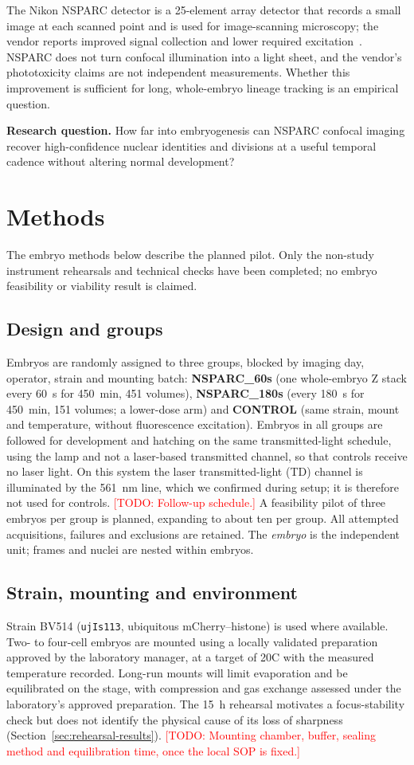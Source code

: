 \documentclass[11pt]{article}
\newcommand{\todo}[1]{\textcolor{red}{[TODO: #1]}}
\begin{document}
The Nikon NSPARC detector is a 25-element array detector that records a small image
at each scanned point and is used for image-scanning microscopy; the vendor reports
improved signal collection and lower required excitation~\cite{nikon}. NSPARC
does not turn confocal illumination into a light sheet, and the vendor's phototoxicity
claims are not independent measurements. Whether this improvement is sufficient for
long, whole-embryo lineage tracking is an empirical question.

\textbf{Research question.} How far into embryogenesis can NSPARC confocal imaging
recover high-confidence nuclear identities and divisions at a useful temporal cadence
without altering normal development?

\section{Methods}
The embryo methods below describe the planned pilot. Only the non-study
instrument rehearsals and technical checks have been completed; no embryo
feasibility or viability result is claimed.
\subsection{Design and groups}
Embryos are randomly assigned to three groups, blocked by imaging day, operator,
strain and mounting batch: \textbf{NSPARC\_60s} (one whole-embryo Z stack every
60~s for 450~min, 451 volumes), \textbf{NSPARC\_180s} (every 180~s for 450~min,
151 volumes; a lower-dose arm) and \textbf{CONTROL} (same strain, mount and
temperature, without fluorescence excitation). Embryos in all groups are followed
for development and hatching on the same transmitted-light schedule, using the
lamp and not a laser-based transmitted channel, so that controls receive no laser
light. On this system the laser transmitted-light (TD) channel is illuminated by
the 561~nm line, which we confirmed during setup; it is therefore not used for
controls. \todo{Follow-up schedule.} A feasibility pilot of three embryos per group is
planned, expanding to about ten per group. All attempted acquisitions, failures
and exclusions are retained. The \emph{embryo} is the independent unit; frames and
nuclei are nested within embryos.

\subsection{Strain, mounting and environment}
Strain BV514 (\texttt{ujIs113}, ubiquitous mCherry--histone) is used where available.
Two- to four-cell embryos are mounted using a locally validated preparation
approved by the laboratory manager, at a target of 20\textdegree C with the measured
temperature recorded. Long-run mounts will limit evaporation and be equilibrated
on the stage, with compression and gas exchange assessed under the laboratory's
approved preparation. The 15~h rehearsal motivates a focus-stability check but
does not identify the physical cause of its loss of sharpness
(Section~\ref{sec:rehearsal-results}).
\todo{Mounting chamber, buffer, sealing method and equilibration time, once the local SOP is fixed.}
\end{document}
